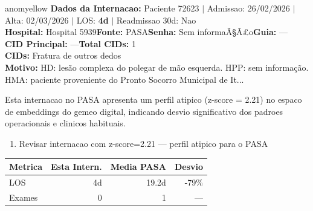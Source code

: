 \documentclass[a4paper,10pt]{article}
\begin{document}
\begin{anomalycard}[Internacao 184829 | PASA | MODERADO (z=2.21)]{anomyellow}
\textbf{Dados da Internacao:} Paciente 72623 $\mid$ Admissao: 26/02/2026 $\mid$ Alta: 02/03/2026 $\mid$ LOS: \textbf{4d} $\mid$ Readmissao 30d: Nao\\
\textbf{Hospital:} Hospital 5939\quad\textbf{Fonte:} PASA\quad\textbf{Senha:} Sem informaÃ§Ã£o\quad\textbf{Guia:} ---\\
\textbf{CID Principal:} {\small ---}\quad\textbf{Total CIDs:} 1\\

\textbf{CIDs:} {\scriptsize Fratura de outros dedos}\\

\textbf{Motivo:} {\scriptsize HD: lesão complexa do polegar de mão esquerda.  HPP: sem informação. HMA: paciente proveniente do Pronto Socorro Municipal de It...}\\

\vspace{2pt}\begin{tcolorbox}[colback=severityred!20,colframe=anomyellow,title={\textbf{Interpretacao de Negocio}},fonttitle=\bfseries\small,left=4pt,right=4pt,top=3pt,bottom=3pt]
{\small Esta internacao no PASA apresenta um perfil atipico (z-score = 2.21) no espaco de embeddings do gemeo digital, indicando desvio significativo dos padroes operacionais e clinicos habituais.}
\end{tcolorbox}
\begin{tcolorbox}[colback=severityyellow!30,colframe=anomorange,title={\textbf{Recomendacoes Especificas}},fonttitle=\bfseries\small,left=4pt,right=4pt,top=3pt,bottom=3pt]
\begin{enumerate}[nosep,leftmargin=16pt]
\item {\small Revisar internacao com z-score=2.21 --- perfil atipico para o PASA}
\end{enumerate}
\end{tcolorbox}
\begin{center}\begin{tabular}{l r r r}\toprule\textbf{Metrica} & \textbf{Esta Intern.} & \textbf{Media PASA} & \textbf{Desvio} \\\midrule
LOS & 4d & 19.2d & -79\% \\
Exames & 0 & 1 & --- \\
\bottomrule\end{tabular}\end{center}


\end{anomalycard}
\end{document}

